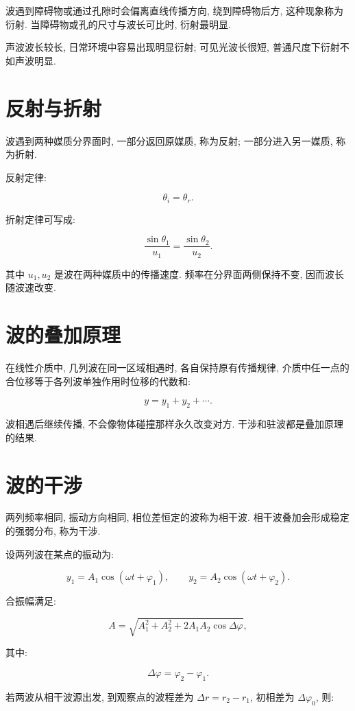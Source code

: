 \documentclass[
  a4paper,
]{ctexrep}
\begin{document}
波遇到障碍物或通过孔隙时会偏离直线传播方向, 绕到障碍物后方,
这种现象称为衍射. 当障碍物或孔的尺寸与波长可比时, 衍射最明显.

声波波长较长, 日常环境中容易出现明显衍射; 可见光波长很短,
普通尺度下衍射不如声波明显.

\section{反射与折射}\label{ux53cdux5c04ux4e0eux6298ux5c04}

波遇到两种媒质分界面时, 一部分返回原媒质, 称为反射; 一部分进入另一媒质,
称为折射.

反射定律:

\[
\theta_i=\theta_r.
\]

折射定律可写成:

\[
\frac{\sin\theta_1}{u_1}=\frac{\sin\theta_2}{u_2}.
\]

其中 \(u_1,u_2\) 是波在两种媒质中的传播速度. 频率在分界面两侧保持不变,
因而波长随波速改变.

\section{波的叠加原理}\label{ux6ce2ux7684ux53e0ux52a0ux539fux7406}

在线性介质中, 几列波在同一区域相遇时, 各自保持原有传播规律,
介质中任一点的合位移等于各列波单独作用时位移的代数和:

\[
y=y_1+y_2+\cdots.
\]

波相遇后继续传播, 不会像物体碰撞那样永久改变对方.
干涉和驻波都是叠加原理的结果.

\section{波的干涉}\label{ux6ce2ux7684ux5e72ux6d89}

两列频率相同, 振动方向相同, 相位差恒定的波称为相干波.
相干波叠加会形成稳定的强弱分布, 称为干涉.

设两列波在某点的振动为:

\[
y_1=A_1\cos(\omega t+\varphi_1),
\qquad
y_2=A_2\cos(\omega t+\varphi_2).
\]

合振幅满足:

\[
A=\sqrt{A_1^2+A_2^2+2A_1A_2\cos\Delta\varphi},
\]

其中:

\[
\Delta\varphi=\varphi_2-\varphi_1.
\]

若两波从相干波源出发, 到观察点的波程差为 \(\Delta r=r_2-r_1\), 初相差为
\(\Delta\varphi_0\), 则:
\end{document}
